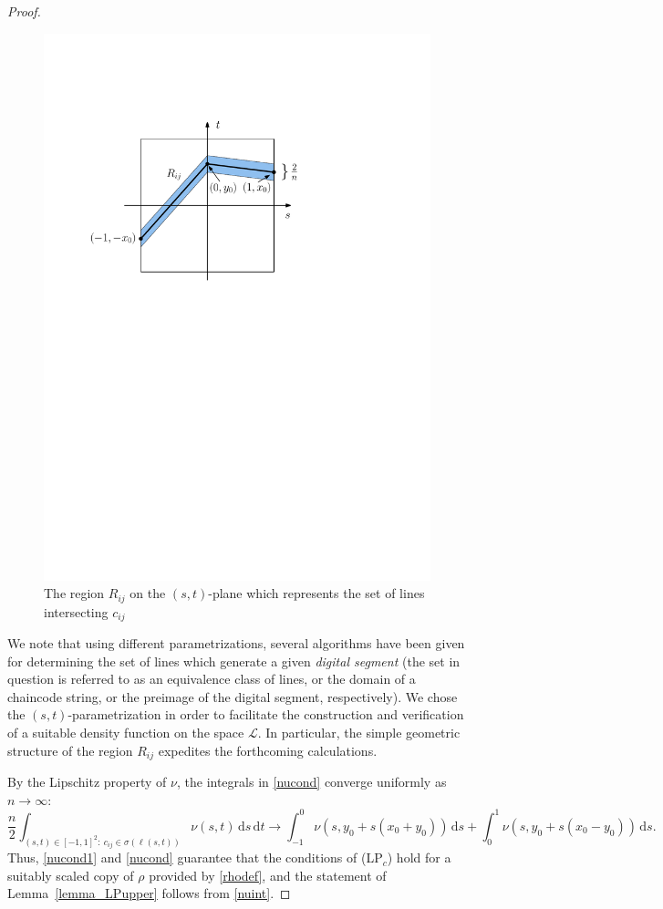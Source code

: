 \documentclass[11pt,a4paper]{amsart}
\newcommand{\dd}{\,\mathrm{d}}
\newcommand{\Lc}{\mathcal{L}}
\begin{document}
\begin{proof}
\begin{figure}[h]
  \centering
  \includegraphics[width = 0.45 \textwidth]{Figures/chess3.pdf}
  \caption{ The region $R_{ij}$ on the $(s,t)$-plane which represents  the set of lines intersecting $c_{ij}$}
\label{fig5}
\end{figure}

We note that using different parametrizations, several algorithms have been given for determining the set of lines which generate a given {\em digital segment} \cite{DS84, MI85, LB93, DA06} (the set in question is referred to as an equivalence class of lines, or the domain of a chaincode string, or the preimage of the digital segment, respectively).
We chose the $(s,t)$-parametrization in order to facilitate the construction and verification of a suitable density function on the space $\Lc$. In particular, the simple geometric structure of the region $R_{ij}$ expedites the forthcoming calculations.





By the Lipschitz property of $\nu$, the integrals in \eqref{nucond} converge uniformly as $n \to \infty$:
\[
\frac n 2 \int_{(s,t) \in [-1,1]^2: \ c_{ij} \in \sigma(\ell(s,t)) } \nu(s,t) \dd s \dd t \rightarrow \int_{-1}^0 \nu (s, y_0 + s(x_0 + y_0) ) \dd s +
\int_{0}^1  \nu (s, y_0 + s(x_0 - y_0) ) \dd s.
\]
Thus, \eqref{nucond1} and  \eqref{nucond} guarantee that the conditions of (LP$_c$) hold for a suitably scaled copy of $\rho$ provided by \eqref{rhodef}, and the statement of Lemma~\ref{lemma_LPupper} follows from  \eqref{nuint}.
\end{proof}
\end{document}
